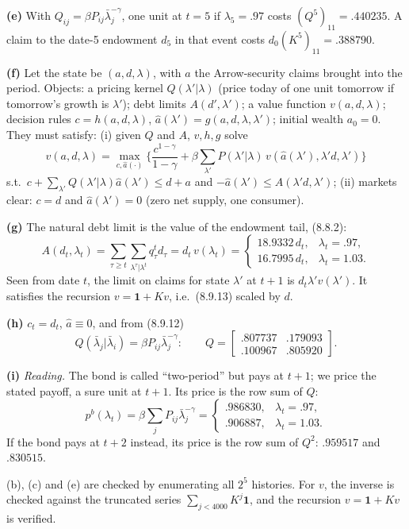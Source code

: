 \documentclass[12pt, letterpaper]{article}
\begin{document}
\begin{tcolorbox}[evenbox,title={Exercise 8.6 \quad Mehra--Prescott endowment, two market structures}]
\textbf{(e)} With $Q_{ij}=\beta P_{ij}\bar\lambda_j^{-\gamma}$, one unit at $t=5$ if $\lambda_5=.97$ costs
$(Q^5)_{11}=.440235$. A claim to the date-5 endowment $d_5$ in that event costs $d_0(K^5)_{11}=.388790$.

\textbf{(f)} Let the state be $(a,d,\lambda)$, with $a$ the Arrow-security claims brought into the period. Objects: a
pricing kernel $Q(\lambda'|\lambda)$ (price today of one unit tomorrow if tomorrow's growth is $\lambda'$); debt
limits $A(d',\lambda')$; a value function $v(a,d,\lambda)$; decision rules $c=h(a,d,\lambda)$,
$\hat a(\lambda')=g(a,d,\lambda,\lambda')$; initial wealth $a_0=0$. They must satisfy: (i) given $Q$ and
$A$, $v,h,g$ solve
\[
v(a,d,\lambda)=\max_{c,\hat a(\cdot)}\Big\{\frac{c^{1-\gamma}}{1-\gamma}+\beta\sum_{\lambda'}P(\lambda'|\lambda)\,v(\hat a(\lambda'),\lambda'd,\lambda')\Big\}
\]
s.t.\ $c+\sum_{\lambda'}Q(\lambda'|\lambda)\hat a(\lambda')\le d+a$ and $-\hat a(\lambda')\le A(\lambda'd,\lambda')$;
(ii) markets clear: $c=d$ and $\hat a(\lambda')=0$ (zero net supply, one consumer).

\textbf{(g)} The natural debt limit is the value of the endowment tail, (8.8.2):
\[
A(d_t,\lambda_t)=\sum_{\tau\ge t}\sum_{\lambda^\tau|\lambda^t}q^t_\tau d_\tau=d_t\,v(\lambda_t)=
\begin{cases}18.9332\,d_t,&\lambda_t=.97,\\16.7995\,d_t,&\lambda_t=1.03.\end{cases}
\]
Seen from date $t$, the limit on claims for state $\lambda'$ at $t+1$ is $d_t\lambda'v(\lambda')$. It satisfies the
recursion $v=\mathbf 1+Kv$, i.e.\ (8.9.13) scaled by $d$.

\textbf{(h)} $c_t=d_t$, $\hat a\equiv0$, and from (8.9.12)
\[
Q(\bar\lambda_j|\bar\lambda_i)=\beta P_{ij}\bar\lambda_j^{-\gamma}:\qquad
Q=\begin{bmatrix}.807737&.179093\\.100967&.805920\end{bmatrix}.
\]

\textbf{(i)} \emph{Reading.} The bond is called ``two-period'' but pays at $t+1$; we price the stated payoff, a sure
unit at $t+1$. Its price is the row sum of $Q$:
\[
p^b(\lambda_t)=\beta\sum_jP_{ij}\bar\lambda_j^{-\gamma}=\begin{cases}.986830,&\lambda_t=.97,\\.906887,&\lambda_t=1.03.\end{cases}
\]
If the bond pays at $t+2$ instead, its price is the row sum of $Q^2$: $.959517$ and $.830515$.

\begin{tcolorbox}[databox]
(b), (c) and (e) are checked by enumerating all $2^5$ histories. For $v$, the inverse is checked against the
truncated series $\sum_{j<4000}K^j\mathbf 1$, and the recursion $v=\mathbf1+Kv$ is verified.
\end{tcolorbox}
\end{tcolorbox}
\end{document}
